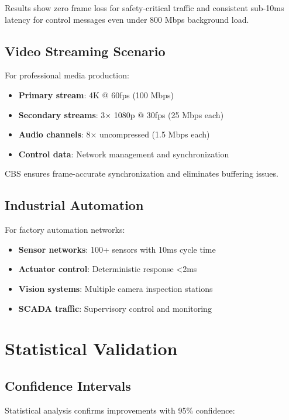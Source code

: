 \documentclass[10pt, journal, compsoc]{IEEEtran}
\begin{document}
Results show zero frame loss for safety-critical traffic and consistent sub-10ms latency for control messages even under 800 Mbps background load.

\subsection{Video Streaming Scenario}

For professional media production:

\begin{itemize}
    \item \textbf{Primary stream}: 4K @ 60fps (100 Mbps)
    \item \textbf{Secondary streams}: 3× 1080p @ 30fps (25 Mbps each)
    \item \textbf{Audio channels}: 8× uncompressed (1.5 Mbps each)
    \item \textbf{Control data}: Network management and synchronization
\end{itemize}

CBS ensures frame-accurate synchronization and eliminates buffering issues.

\subsection{Industrial Automation}

For factory automation networks:

\begin{itemize}
    \item \textbf{Sensor networks}: 100+ sensors with 10ms cycle time
    \item \textbf{Actuator control}: Deterministic response <2ms
    \item \textbf{Vision systems}: Multiple camera inspection stations
    \item \textbf{SCADA traffic}: Supervisory control and monitoring
\end{itemize}

\section{Statistical Validation}

\subsection{Confidence Intervals}

Statistical analysis confirms improvements with 95\% confidence:
\end{document}
